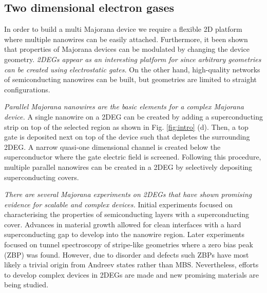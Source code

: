 

\subsection{Two dimensional electron gases}

In order to build a multi Majorana device we require a flexible 2D platform where multiple nanowires can be easily attached.
Furthermore, it been shown that properties of Majorana devices can be modulated by changing the device geometry.
\textit{2DEGs appear as an interesting platform for since arbitrary geometries can be created using electrostatic gates.}
On the other hand, high-quality networks of semiconducting nanowires can be built, but geometries are limited to straight configurations.

\textit{Parallel Majorana nanowires are the basic elements for a complex Majorana device.}
A single nanowire on a 2DEG can be created by adding a superconducting strip on top of the selected region as shown in Fig. \ref{fig:intro} (d).
Then, a top gate is deposited next on top of the device such that depletes the surrounding 2DEG.
A narrow quasi-one dimensional channel is created below the superconductor where the gate electric field is screened\cite{Hell2017}.
Following this procedure, multiple parallel nanowires can be created in a 2DEG by selectively depositing superconducting covers.

\textit{There are several Majorana experiments on 2DEGs that have shown promising evidence for scalable and complex devices.}
Initial experiments\cite{Shabani2015,Kjaergaard2016} focused on characterising the properties of semiconducting layers with a superconducting cover.
Advances in material growth allowed for clean interfaces with a hard superconducting gap to develop into the nanowire region.
Later experiments focused on tunnel spectroscopy of stripe-like geometries\cite{Suominen2017} where a zero bias peak (ZBP) was found.
However, due to disorder and defects such ZBPs have most likely a trivial origin from Andreev states rather than MBS.
Nevertheless, efforts to develop complex devices in 2DEGs are made and new promising materials are being studied.

